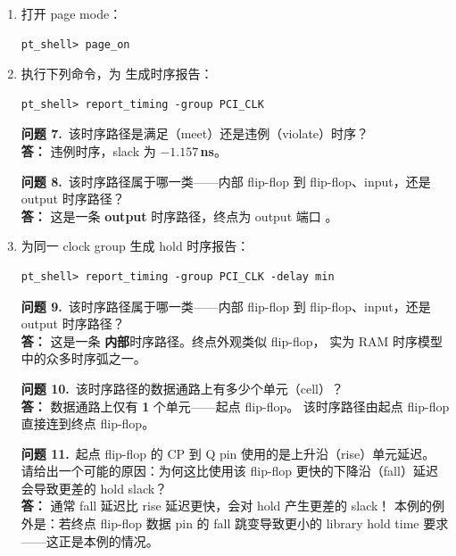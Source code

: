 \begin{enumerate}
  \item 打开 page mode：
\begin{lstlisting}
pt_shell> page_on
\end{lstlisting}

  \item 执行下列命令，为  生成时序报告：
\begin{lstlisting}
pt_shell> report_timing -group PCI_CLK
\end{lstlisting}

\begin{questionBox}
\textbf{问题 7.}\ 该时序路径是满足（meet）还是违例（violate）时序？\\[0.35em]
\textbf{答：} 违例时序，slack 为 \textbf{$-1.157$\,ns}。

\textbf{问题 8.}\ 该时序路径属于哪一类——内部 flip-flop 到 flip-flop、input，还是 output 时序路径？\\[0.35em]
\textbf{答：} 这是一条 \textbf{output} 时序路径，终点为 output 端口 。
\end{questionBox}

  \item 为同一 clock group  生成 hold 时序报告：
\begin{lstlisting}
pt_shell> report_timing -group PCI_CLK -delay min
\end{lstlisting}

\begin{questionBox}
\textbf{问题 9.}\ 该时序路径属于哪一类——内部 flip-flop 到 flip-flop、input，还是 output 时序路径？\\[0.35em]
\textbf{答：} 这是一条 \textbf{内部}时序路径。终点外观类似 flip-flop，
实为 RAM 时序模型中的众多时序弧之一。

\textbf{问题 10.}\ 该时序路径的数据通路上有多少个单元（cell）？\\[0.35em]
\textbf{答：} 数据通路上仅有 \textbf{1} 个单元——起点 flip-flop。
该时序路径由起点 flip-flop 直接连到终点 flip-flop。

\textbf{问题 11.}\ 起点 flip-flop 的 CP 到 Q pin 使用的是上升沿（rise）单元延迟。
        请给出一个可能的原因：为何这比使用该 flip-flop 更快的下降沿（fall）延迟会导致更差的 hold slack？\\[0.35em]
\textbf{答：} 通常 fall 延迟比 rise 延迟更快，会对 hold 产生更差的 slack！
本例的例外是：若终点 flip-flop 数据 pin 的 fall 跳变导致更小的 library hold time 要求——这正是本例的情况。
\end{questionBox}


\end{enumerate}
